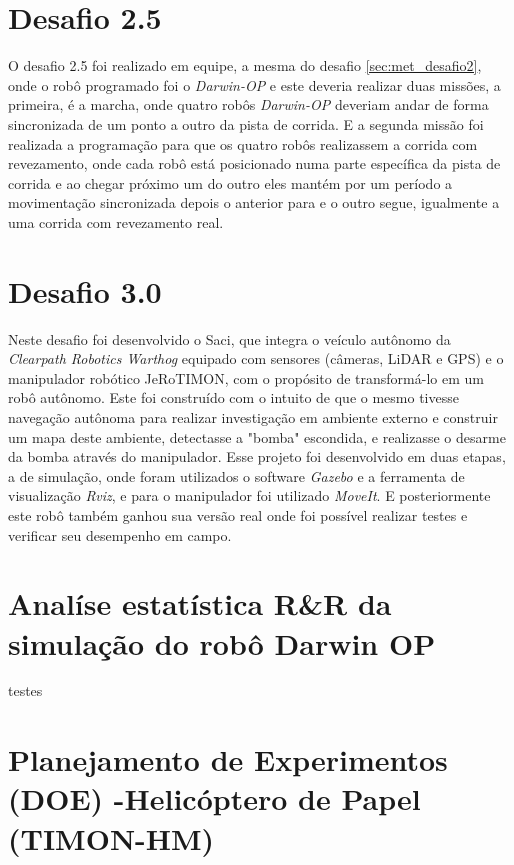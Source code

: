 \section{Desafio 2.5}
\label{sec:met_desafio2_5}
O desafio 2.5 foi realizado em equipe, a mesma do desafio \ref{sec:met_desafio2}, onde o robô programado foi o \textit{Darwin-OP} e este deveria realizar duas missões, a primeira, é a marcha, onde quatro robôs \textit{Darwin-OP} deveriam andar de forma sincronizada de um ponto a outro da pista de corrida. E a segunda missão foi realizada a programação para que os quatro robôs realizassem a corrida com revezamento, onde cada robô está posicionado numa parte específica da pista de corrida e ao chegar próximo um do outro eles mantém por um período a movimentação sincronizada depois o anterior para e o outro segue, igualmente a uma corrida com revezamento real.


\section{Desafio 3.0}
\label{sec:met_desafio3}
Neste desafio foi desenvolvido o Saci, que integra o veículo autônomo da \textit{Clearpath Robotics Warthog} equipado com sensores (câmeras, LiDAR e GPS) e o manipulador robótico JeRoTIMON, com o propósito de transformá-lo em um robô autônomo. Este foi construído com o intuito de que o mesmo tivesse navegação autônoma para realizar investigação em ambiente externo e construir um mapa deste ambiente, detectasse a "bomba" escondida, e realizasse o desarme da bomba através do manipulador. 
Esse projeto foi desenvolvido em duas etapas, a de simulação, onde foram utilizados o software  \textit{Gazebo} e a ferramenta de visualização \textit{Rviz}, e para o manipulador foi utilizado \textit{MoveIt}. E posteriormente este robô também ganhou sua versão real onde foi possível realizar testes e verificar seu desempenho em campo.



\section{Analíse estatística R\&R da simulação do robô Darwin OP }
\label{sec:met_analise_darwin}

testes

\section{Planejamento de Experimentos (DOE) -Helicóptero de Papel (TIMON-HM)}
\label{sec:met_analise_doe}